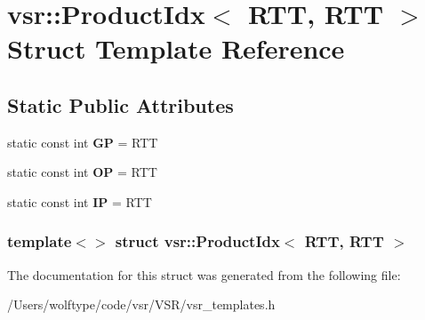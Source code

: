 \hypertarget{structvsr_1_1_product_idx_3_01_r_t_t_00_01_r_t_t_01_4}{\section{vsr\-:\-:Product\-Idx$<$ R\-T\-T, R\-T\-T $>$ Struct Template Reference}
\label{structvsr_1_1_product_idx_3_01_r_t_t_00_01_r_t_t_01_4}
}
\subsection*{Static Public Attributes}
\begin{DoxyCompactItemize}
\item 
\hypertarget{structvsr_1_1_product_idx_3_01_r_t_t_00_01_r_t_t_01_4_a540fc81169af8653cba814c2280bd215}{static const int {\bfseries G\-P} = R\-T\-T}\label{structvsr_1_1_product_idx_3_01_r_t_t_00_01_r_t_t_01_4_a540fc81169af8653cba814c2280bd215}

\item 
\hypertarget{structvsr_1_1_product_idx_3_01_r_t_t_00_01_r_t_t_01_4_aebfdaba873a10d0222a1413f26b14b99}{static const int {\bfseries O\-P} = R\-T\-T}\label{structvsr_1_1_product_idx_3_01_r_t_t_00_01_r_t_t_01_4_aebfdaba873a10d0222a1413f26b14b99}

\item 
\hypertarget{structvsr_1_1_product_idx_3_01_r_t_t_00_01_r_t_t_01_4_ab6d792b2cdad5e8f7a6cfff19e1db999}{static const int {\bfseries I\-P} = R\-T\-T}\label{structvsr_1_1_product_idx_3_01_r_t_t_00_01_r_t_t_01_4_ab6d792b2cdad5e8f7a6cfff19e1db999}

\end{DoxyCompactItemize}
\subsubsection*{template$<$$>$ struct vsr\-::\-Product\-Idx$<$ R\-T\-T, R\-T\-T $>$}



The documentation for this struct was generated from the following file\-:\begin{DoxyCompactItemize}
\item 
/\-Users/wolftype/code/vsr/\-V\-S\-R/vsr\-\_\-templates.\-h\end{DoxyCompactItemize}
